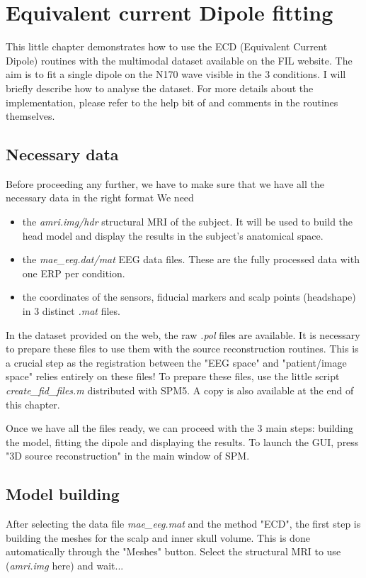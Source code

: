 \chapter{Equivalent current Dipole fitting \label{Chap:eeg:ECD}}

This little chapter demonstrates how to use the ECD (Equivalent Current Dipole) routines with the multimodal dataset available on the FIL website. The aim is to fit a single dipole on the N170 wave visible in the 3 conditions.
I will briefly describe how to analyse the dataset. For more details about the implementation, please refer to the help bit of and comments in the routines themselves.

\section{Necessary data}
Before proceeding any further, we have to make sure that we have all the necessary data in the right format
We need 
\begin{itemize}
\item the {\it amri.img/hdr} structural MRI of the subject. It will be used to build the head model and display the results in the subject's anatomical space.\\
\item the {\it mae\_eeg.dat/mat} EEG data files. These are the fully processed data with one ERP per condition.
\item the coordinates of the sensors, fiducial markers and scalp points (headshape) in 3 distinct {\it *.mat} files.
\end{itemize}

In the dataset provided on the web, the raw {\it *.pol} files are available. It is necessary to prepare these files to use them with the source reconstruction routines. This is a crucial step as the registration between the "EEG space" and "patient/image space" relies entirely on these files! 
To prepare these files, use the little script {\it create\_fid\_files.m} distributed with SPM5. A copy is also available at the end of this chapter.

Once we have all the files ready, we can proceed with the 3 main steps: building the model, fitting the dipole and displaying the results. To launch the GUI, press "3D source reconstruction" in the main window of SPM.

\section{Model building}
After selecting the data file {\it mae\_eeg.mat} and the method "ECD", the first step is building the meshes for the scalp and inner skull volume. This is done automatically through the "Meshes" button. Select the structural MRI to use ({\it amri.img} here) and wait...

